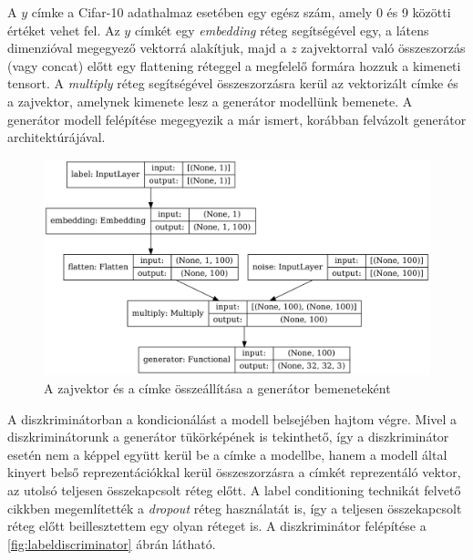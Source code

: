 A $y$ címke a Cifar-10 adathalmaz esetében egy egész szám, amely 0 és 9 közötti értéket vehet fel. Az $y$ címkét egy \textit{embedding} réteg segítségével egy, a látens dimenzióval megegyező vektorrá alakítjuk, majd a $z$ zajvektorral való összeszorzás (vagy concat) előtt egy flattening réteggel a megfelelő formára hozzuk a kimeneti tensort.
A \textit{multiply} réteg segítségével összeszorzásra kerül az vektorizált címke és a zajvektor, amelynek kimenete lesz a generátor modellünk bemenete. A generátor modell felépítése megegyezik a már ismert, korábban felvázolt generátor architektúrájával. 

\begin{figure}[h]
\centering
\includegraphics[width=13cm]{images/label_noise_embedding.png}
\caption{A zajvektor és a címke összeállítása a generátor bemeneteként}
\label{fig:labelnoiseembedding}
\end{figure}

A diszkriminátorban a kondicionálást a modell belsejében hajtom végre. Mivel a diszkriminátorunk a generátor tükörképének is tekinthető, így a diszkriminátor esetén nem a képpel együtt kerül be a címke a modellbe, hanem a modell által kinyert belső reprezentációkkal kerül összeszorzásra a címkét reprezentáló vektor, az utolsó teljesen összekapcsolt réteg előtt. A label conditioning technikát felvető cikkben megemlítették a \textit{dropout} réteg használatát is, így a teljesen összekapcsolt réteg előtt beillesztettem egy olyan réteget is.
A diszkriminátor felépítése a \ref{fig:labeldiscriminator} ábrán látható.

